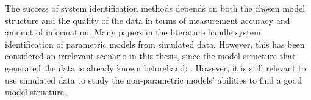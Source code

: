 The success of system identification methods depends on both the chosen model structure and the quality of the data in terms of measurement accuracy and amount of information. Many papers in the literature handle system identification of parametric models from simulated data. However, this has been considered an irrelevant scenario in this thesis, since the model structure that generated the data is already known beforehand;  \cite{millerShipModelIdentification2021}. However, it is still relevant to use simulated data to study the non-parametric models' abilities to find a good model structure.

